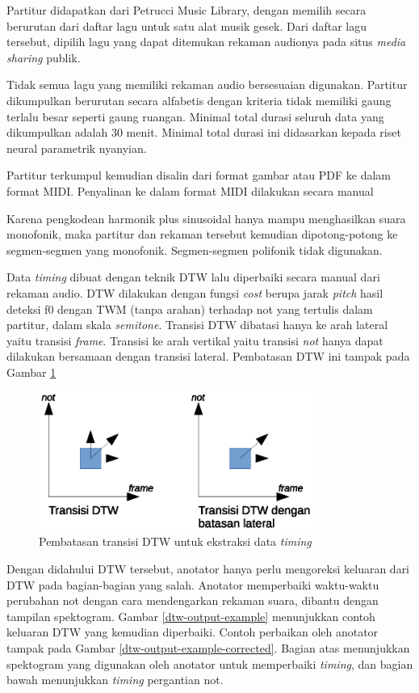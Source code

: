 Partitur didapatkan dari Petrucci Music Library, dengan memilih secara berurutan dari daftar lagu untuk satu alat musik gesek. Dari daftar lagu tersebut, dipilih lagu yang dapat ditemukan rekaman audionya pada situs \textit{media sharing} publik.

Tidak semua lagu yang memiliki rekaman audio bersesuaian digunakan. Partitur dikumpulkan berurutan secara alfabetis dengan kriteria tidak memiliki gaung terlalu besar seperti gaung ruangan. Minimal total durasi seluruh data yang dikumpulkan adalah 30 menit. Minimal total durasi ini didasarkan kepada riset neural parametrik nyanyian.

Partitur terkumpul kemudian disalin dari format gambar atau PDF ke dalam format MIDI. Penyalinan ke dalam format MIDI dilakukan secara manual

Karena pengkodean harmonik plus sinusoidal hanya mampu menghasilkan suara monofonik, maka partitur dan rekaman tersebut kemudian dipotong-potong ke segmen-segmen yang monofonik. Segmen-segmen polifonik tidak digunakan.

Data \textit{timing} dibuat dengan teknik DTW lalu diperbaiki secara manual dari rekaman audio. DTW dilakukan dengan fungsi \textit{cost} berupa jarak \textit{pitch} hasil deteksi f0 dengan TWM (tanpa arahan) terhadap  not yang tertulis dalam partitur, dalam skala \textit{semitone}. Transisi DTW dibatasi hanya ke arah lateral yaitu transisi \textit{frame}. Transisi ke arah vertikal yaitu transisi \textit{not} hanya dapat dilakukan bersamaan dengan transisi lateral. Pembatasan DTW ini tampak pada Gambar \ref{fig-dtw-transition}

\begin{figure}[htb]
    \centering
    \includegraphics[width=0.8\textwidth]{resources/DTW-transition.eps}
    \caption{Pembatasan transisi DTW untuk ekstraksi data \textit{timing}}\label{fig-dtw-transition}
\end{figure}

Dengan didahului DTW tersebut, anotator hanya perlu mengoreksi keluaran dari DTW pada bagian-bagian yang salah. Anotator memperbaiki waktu-waktu perubahan not dengan cara mendengarkan rekaman suara, dibantu dengan tampilan spektogram. Gambar \ref{dtw-output-example} menunjukkan contoh keluaran DTW yang kemudian diperbaiki. Contoh perbaikan oleh anotator tampak pada Gambar \ref{dtw-output-example-corrected}. Bagian atas menunjukkan spektogram yang digunakan oleh anotator untuk memperbaiki \textit{timing}, dan bagian bawah menunjukkan \textit{timing} pergantian not.

